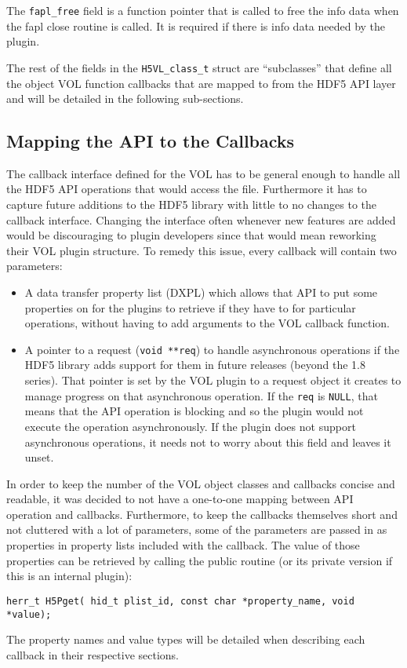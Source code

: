 The {\tt fapl\_free} field is a function pointer that is called to
free the info data when the fapl close routine is called. It is
required if there is info data needed by the plugin.

The rest of the fields in the {\tt H5VL\_class\_t} struct are
``subclasses'' that define all the object VOL function callbacks that
are mapped to from the HDF5 API layer and will be detailed in the
following sub-sections.

\subsection{Mapping the API to the Callbacks}
\label{sec:map}

The callback interface defined for the VOL has to be general enough to
handle all the HDF5 API operations that would access the
file. Furthermore it has to capture future additions to the HDF5
library with little to no changes to the callback interface. Changing
the interface often whenever new features are added would be
discouraging to plugin developers since that would mean reworking
their VOL plugin structure. To remedy this issue, every callback will
contain two parameters:
\begin{itemize}
\item A data transfer property list (DXPL) which allows that API to
  put some properties on for the plugins to retrieve if they have to
  for particular operations, without having to add arguments to the
  VOL callback function.
\item A pointer to a request ({\tt void **req}) to handle asynchronous
  operations if the HDF5 library adds support for them in future
  releases (beyond the 1.8 series). That pointer is set by the VOL
  plugin to a request object it creates to manage progress on that
  asynchronous operation. If the {\tt req} is {\tt NULL}, that means
  that the API operation is blocking and so the plugin would not
  execute the operation asynchronously. If the plugin does not support
  asynchronous operations, it needs not to worry about this field and
  leaves it unset.
\end{itemize}

In order to keep the number of the VOL object classes and callbacks
concise and readable, it was decided to not have a one-to-one mapping
between API operation and callbacks. Furthermore, to keep the
callbacks themselves short and not cluttered with a lot of parameters,
some of the parameters are passed in as properties in property lists
included with the callback. The value of those properties can be
retrieved by calling the public routine (or its private version if
this is an internal plugin): 
\begin{lstlisting}
herr_t H5Pget( hid_t plist_id, const char *property_name, void *value);
\end{lstlisting}
The property names and value types will be detailed when describing
each callback in their respective sections.

